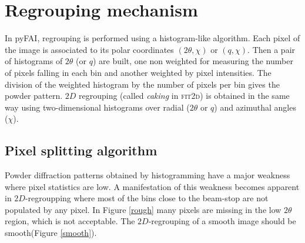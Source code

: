\documentclass[a4paper]{jpconf}
\begin{document}
\section{Regrouping mechanism}
In pyFAI, regrouping is performed using a histogram-like algorithm.
Each pixel of the image is associated to its polar coordinates
$(2\theta , \chi )$ or $(q, \chi )$. Then a pair of histograms of $2\theta$
(or $q$) are built, one non weighted for measuring the number of pixels falling in each bin and
another weighted by pixel intensities.
The division of the weighted histogram by the number of pixels per bin gives
the powder pattern.
$2D$ regrouping (called \textit{caking} in \textsc{fit2d}) is obtained in the
same way using two-dimensional histograms over radial ($2\theta$ or $q$) and azimuthal angles
($\chi$).

\subsection{Pixel splitting algorithm}
Powder diffraction patterns obtained by histogramming have a major weakness where
pixel statistics are low.
A manifestation of this weakness becomes apparent in $2D$-regroupping where most of
the bins close to the beam-stop are not populated by any pixel.
In Figure \ref{rough} many pixels are missing in the low $2\theta$ region,
which is not acceptable.
The  $2D$-regrouping of a smooth image should be smooth(Figure \ref{smooth}).
\end{document}
